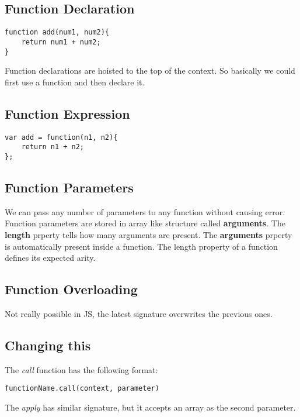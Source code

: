 \documentclass[12pt, a4paper]{article}
\begin{document}
\subsection{Function Declaration}
\begin{verbatim}
function add(num1, num2){
    return num1 + num2;
}
\end{verbatim}
Function declarations are hoisted to the top of the context. So basically we could first use a function and then declare it.
\subsection{Function Expression}
\begin{verbatim}
var add = function(n1, n2){
    return n1 + n2;
};
\end{verbatim}
\subsection{Function Parameters}
We can pass any number of parameters to any function without causing error.
Function parameters are stored in array like structure called \textbf{arguments}.
The \textbf{length} prperty tells how many arguments are present. 
The \textbf{arguments} prperty is automatically present inside a function.
The length property of a function defines its expected arity.
\subsection{Function Overloading}
Not really possible in JS, the latest signature overwrites the previous ones.
\subsection{Changing this}
The \emph{call} function has the following format:
\begin{verbatim}
functionName.call(context, parameter)
\end{verbatim}
The \emph{apply} has similar signature, but it accepts an array as the second parameter.
\end{document}

